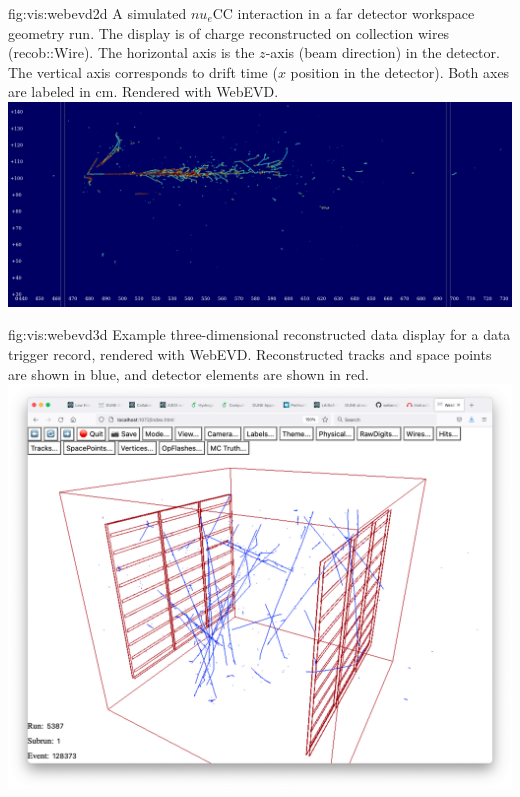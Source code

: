 \documentclass[../main-v1.tex]{subfiles}
\begin{document}
\begin{dunefigure}
{fig:vis:webevd2d} 
{A simulated $nu_e$CC interaction in a far detector workspace geometry run. The display is of charge reconstructed on collection wires (recob::Wire). The horizontal axis is the $z$-axis (beam direction) in the detector. The vertical axis corresponds to drift time ($x$ position in the detector). Both axes are labeled in cm. Rendered with WebEVD. }
\includegraphics[width=0.9 \textwidth]{graphics/EventDisplays/webevd_nuecc_sim.png}
\end{dunefigure}

\begin{dunefigure}
{fig:vis:webevd3d} 
{ Example three-dimensional reconstructed data display for a  data trigger record, rendered with WebEVD. Reconstructed tracks and space points are shown in blue, and detector elements are shown in red.}
\includegraphics[width=0.9 \textwidth]{graphics/EventDisplays/webevd_pdsp3d.png}
\end{dunefigure}
\end{document}

